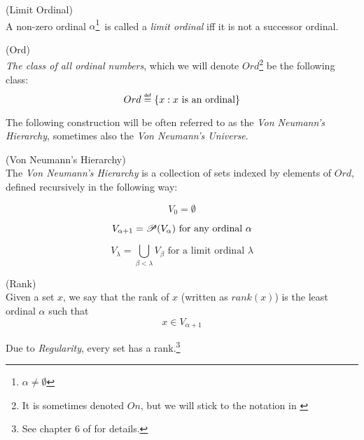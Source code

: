 \begin{definition}{(Limit Ordinal)}\label{def:limit_ordinal}\\
A non-zero ordinal $\alpha$\footnote{$\alpha \neq \emptyset$} is called a \emph{limit ordinal} iff it is not a successor ordinal.
\end{definition}

\begin{definition}{(Ord)}\label{def:ord}\\
\emph{The class of all ordinal numbers}, which we will denote $Ord$\footnote{It is sometimes denoted $On$, but we will stick to the notation in \cite{JechBook}} be the following class:
\begin{equation}
Ord \defeq \{x : x\mbox{ is an ordinal}\}
\end{equation}
\end{definition}

The following construction will be often referred to as the \emph{Von Neumann's Hierarchy}, sometimes also the \emph{Von Neumann's Universe}. %

\begin{definition}{(Von Neumann's Hierarchy)}\label{def:von_neumann}\\
The \emph{Von Neumann's Hierarchy} is a collection of sets indexed by elements of $Ord$, defined recursively in the following way:
\bce[(i)]
\item 
\begin{equation}
V_0 = \emptyset
\end{equation}
\item 
\begin{equation}
V_{\alpha+1} = \mathscr{P} (V_\alpha)\mbox{ for any ordinal $\alpha$}
\end{equation}
\item
\begin{equation} 
V_\lambda = \bigcup_{\beta < \lambda} V_\beta \mbox{ for a limit ordinal $\lambda$}
\end{equation}
\ece
\end{definition}

\begin{definition}{(Rank)}\label{def:rank}\\
Given a set $x$, we say that the rank of $x$ (written as $rank(x)$) is the least ordinal $\alpha$ such that
\begin{equation}
x \in V_{\alpha+1}
\end{equation}
\end{definition}
Due to \emph{Regularity}, every set has a rank.\footnote{See chapter 6 of \cite{JechBook} for details.}

